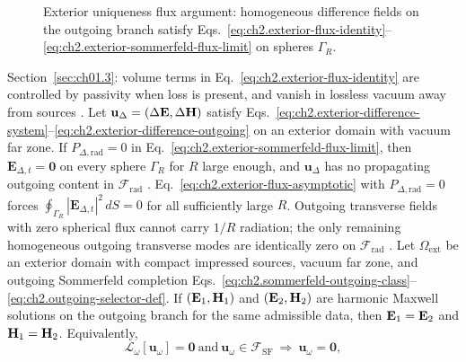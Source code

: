 \begin{figure}[t]
\centering
{}
\caption{Exterior uniqueness flux argument: homogeneous difference fields on the
outgoing branch satisfy Eqs.~\eqref{eq:ch2.exterior-flux-identity}--\eqref{eq:ch2.exterior-sommerfeld-flux-limit}
on spheres \(\Gamma_R\).}
\label{fig:ch2.exterior-uniqueness-flux}
\end{figure}
Section~\ref{sec:ch01.3}: volume terms in
Eq.~\eqref{eq:ch2.exterior-flux-identity} are controlled by passivity when loss is
present, and vanish in lossless vacuum away from sources \cite{stratton1941}. \label{lem:ch2.zero-flux-difference}
Let \(\mathbf{u}_\Delta=(\Delta\mathbf{E},\Delta\mathbf{H})\) satisfy
Eqs.~\eqref{eq:ch2.exterior-difference-system}--\eqref{eq:ch2.exterior-difference-outgoing}
on an exterior domain with vacuum far zone. If
\(P_{\Delta,\mathrm{rad}}=0\) in Eq.~\eqref{eq:ch2.exterior-sommerfeld-flux-limit},
then \(\mathbf{E}_{\Delta,t}=\mathbf{0}\) on every sphere \(\Gamma_R\) for
\(R\) large enough, and \(\mathbf{u}_\Delta\) has no propagating outgoing content in
\(\mathcal{F}_{\mathrm{rad}}\) \cite{stratton1941}.
Eq.~\eqref{eq:ch2.exterior-flux-asymptotic} with \(P_{\Delta,\mathrm{rad}}=0\) forces
\(\oint_{\Gamma_R}|\mathbf{E}_{\Delta,t}|^{2}\,dS=0\) for all sufficiently large
\(R\). Outgoing transverse fields with zero spherical flux cannot carry
\(1/R\) radiation; the only remaining homogeneous outgoing transverse modes are
identically zero on \(\mathcal{F}_{\mathrm{rad}}\) \cite{stratton1941}. \label{thm:ch2.exterior-radiative-uniqueness}
Let \(\Omega_{\mathrm{ext}}\) be an exterior domain with compact impressed sources,
vacuum far zone, and outgoing Sommerfeld completion
Eqs.~\eqref{eq:ch2.sommerfeld-outgoing-class}--\eqref{eq:ch2.outgoing-selector-def}.
If \((\mathbf{E}_1,\mathbf{H}_1)\) and \((\mathbf{E}_2,\mathbf{H}_2)\) are harmonic Maxwell solutions on the outgoing
branch for the same admissible data, then \(\mathbf{E}_1=\mathbf{E}_2\) and \(\mathbf{H}_1=\mathbf{H}_2\).
Equivalently,
\begin{equation}
\label{eq:ch2.exterior-uniqueness-theorem}
\mathcal{L}_\omega[\mathbf{u}_\omega]=\mathbf{0}
\ \text{and}\ 
\mathbf{u}_\omega\in\mathcal{F}_{\mathrm{SF}}
\ \Longrightarrow\
\mathbf{u}_\omega=\mathbf{0},
\end{equation}
